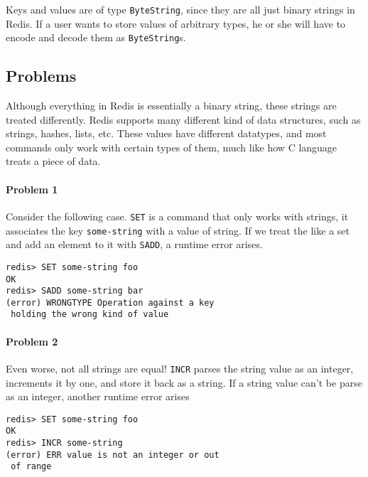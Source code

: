 \documentclass[pldi]{sigplanconf-pldi16}
\begin{document}
Keys and values are of type \texttt{ByteString}, since they are all
 just binary strings in Redis. If a user wants to store values of
 arbitrary types, he or she will have to encode and decode them as
 \texttt{ByteString}s.


\subsection{Problems}


Although everything in Redis is essentially a binary string, these strings are
 treated differently. Redis supports many different kind of data structures,
 such as strings, hashes, lists, etc. These values have different datatypes,
 and most commands only work with certain types of them, much like how C
 language treats a piece of data.

\paragraph{Problem 1} Consider the following case. \texttt{SET} is
 a command that only works with strings, it associates the key
 \texttt{some-string} with a value of string. If we treat the like a
 set and add an element to it with \texttt{SADD}, a runtime error
 arises.

\begin{verbatim}
redis> SET some-string foo
OK
redis> SADD some-string bar
(error) WRONGTYPE Operation against a key
 holding the wrong kind of value
\end{verbatim}

\paragraph{Problem 2} Even worse, not all strings are equal!
 \texttt{INCR} parses the string value as an integer, increments it by
 one, and store it back as a string. If a string value can't be parse as an
 integer, another runtime error arises

\begin{verbatim}
redis> SET some-string foo
OK
redis> INCR some-string
(error) ERR value is not an integer or out
 of range
\end{verbatim}
\end{document}
